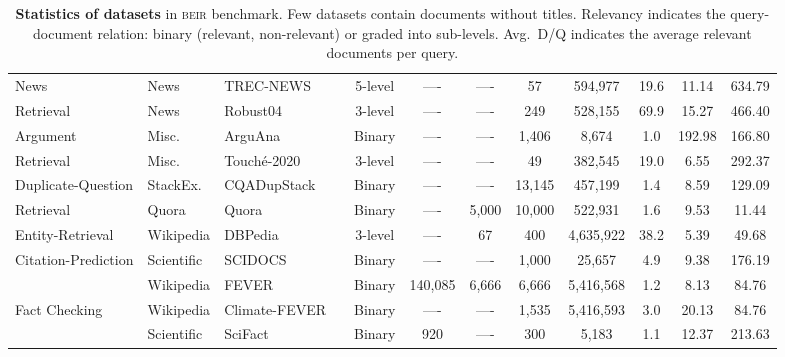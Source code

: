 \documentclass{article}
\newcommand{\cmark}{\color{mygray}\ding{51}}%
\newcommand{\xmark}{\color{mygray}\ding{55}}%
\newcommand{\custo}[1]{\textsc{\normalsize #1}}
\newcommand{\beir}{\custo{beir}\xspace}
\begin{document}
\begin{table}[t!]
{\begin{tabular}{ l | l | l | c | c | c | c | c c c | c c }
    News      &News& TREC-NEWS  \cite{soboroff2019trec}    & \cmark & 5-level &   ----    &   ----  & 57     & 594,977 & 19.6 & 11.14  & 634.79  \\
    Retrieval      &News& Robust04 \cite{96071}    & \xmark & 3-level &   ----    &   ----  & 249   & 528,155 & 69.9 & 15.27  & 466.40  \\ \midrule
    Argument       & Misc. & ArguAna  \cite{wachsmuth:2018a}    & \cmark & Binary  &   ----    &   ----  & 1,406  & 8,674     & 1.0  & 192.98& 166.80 \\
    Retrieval   & Misc. & Touch\'e-2020 \cite{stein:2020v} & \cmark & 3-level &   ----    &   ----  & 49     & 382,545   & 19.0 & 6.55  & 292.37 \\ \midrule
    Duplicate-Question   &StackEx.& CQADupStack \cite{hoogeveen2015cqadupstack}  & \cmark & Binary  &   ----    &   ----  & 13,145 & 457,199   & 1.4  & 8.59  & 129.09 \\
    Retrieval            & Quora &  Quora        & \xmark & Binary  &   ----    & 5,000 & 10,000 & 522,931   & 1.6  & 9.53  & 11.44  \\ \midrule
    Entity-Retrieval     & Wikipedia  &  DBPedia  \cite{Hasibi:2017:DVT}     & \cmark & 3-level &   ----    &   67  & 400    & 4,635,922 & 38.2 & 5.39  & 49.68  \\ \midrule
    Citation-Prediction  & Scientific&  SCIDOCS  \cite{cohan-etal-2020-specter}     & \cmark & Binary  &   ----    &   ----  & 1,000  & 25,657    & 4.9  & 9.38  & 176.19 \\ \midrule
                         & Wikipedia  &  FEVER \cite{thorne-etal-2018-fever}       & \cmark & Binary  & 140,085 & 6,666 & 6,666  & 5,416,568 & 1.2  & 8.13  & 84.76  \\ 
    Fact Checking        & Wikipedia  & Climate-FEVER \cite{diggelmann2020climatefever} & \cmark & Binary  &   ----    &   ----  & 1,535  & 5,416,593 & 3.0  & 20.13 & 84.76  \\
                         & Scientific & SciFact  \cite{wadden-etal-2020-fact}     & \cmark & Binary  &   920      &   ----  &  300   & 5,183     & 1.1  & 12.37 & 213.63  \\
    \bottomrule
    \end{tabular}}
    \vspace{-2mm} 
    \caption{\textbf{Statistics of datasets} in \beir benchmark. Few datasets contain documents without titles. Relevancy indicates the query-document relation: binary (relevant, non-relevant) or graded into sub-levels. Avg.~D/Q indicates the average relevant documents per query. \vspace{-5mm}}
    \label{tab:dataset_stats}
\end{table}
\end{document}
